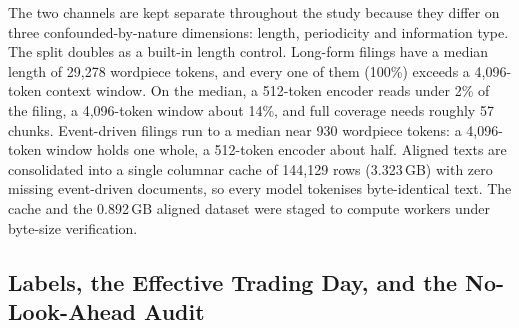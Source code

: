 The two channels are kept separate throughout the study because they differ on three confounded-by-nature dimensions: length, periodicity and information type. The split doubles as a built-in length control. Long-form filings have a median length of 29{,}278 wordpiece tokens, and every one of them (100\%) exceeds a 4{,}096-token context window. %
On the median, a 512-token encoder reads under 2\% of the filing, a 4{,}096-token window about 14\%, and full coverage needs roughly 57 chunks. Event-driven filings run to a median near 930 wordpiece tokens: a 4{,}096-token window holds one whole, a 512-token encoder about half. %
Aligned texts are consolidated into a single columnar cache of 144{,}129 rows (3.323\,GB) with zero missing event-driven documents, so every model tokenises byte-identical text. The cache and the 0.892\,GB aligned dataset were staged to compute workers under byte-size verification. %

\subsection{Labels, the Effective Trading Day, and the No-Look-Ahead Audit}
\label{sec:data-labels}

